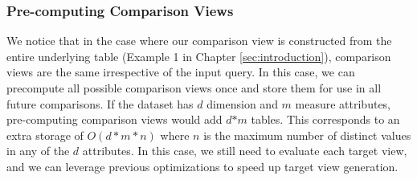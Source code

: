 % 
% 


  \subsubsection {Pre-computing Comparison Views}
  We notice that in the case where our comparison view is constructed from the
  entire underlying table (Example 1 in Chapter \ref{sec:introduction}),
  comparison views are the same irrespective of the input query.
  In this case, we can precompute all possible comparison views once and store
  them for use in all future comparisons. If the dataset has $d$ dimension and
  $m$ measure attributes, pre-computing comparison views would add $d$$\ast$$m$
  tables. This corresponds to an extra storage of $O(d\ast m \ast n)$ where $n$
  is the maximum number of distinct values in any of the $d$ attributes. In this
  case, we still need to evaluate each target view, and we can leverage previous
  optimizations to speed up target view generation.
  
